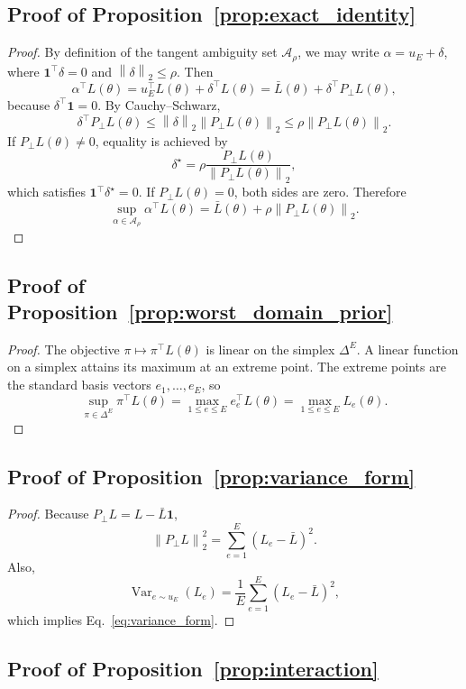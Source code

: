\documentclass{article}
\theoremstyle{definition}
\newcommand{\cA}{\mathcal{A}}
\newcommand{\Var}{\operatorname{Var}}
\newcommand{\one}{\mathbf{1}}
\newcommand{\simplex}{\Delta}
\newcommand{\norm}[1]{\left\lVert #1 \right\rVert}
\newcommand{\ub}{u_E}
\begin{document}
\subsection{Proof of Proposition~\ref{prop:exact_identity}}

\begin{proof}
By definition of the tangent ambiguity set \(\cA_\rho\), we may write \(\alpha=\ub+\delta\), where \(\one^\top\delta=0\) and \(\norm{\delta}_2\le \rho\). Then
\[
\alpha^\top L(\theta)
=
\ub^\top L(\theta) + \delta^\top L(\theta)
=
\bar L(\theta) + \delta^\top P_\perp L(\theta),
\]
because \(\delta^\top \one=0\). By Cauchy--Schwarz,
\[
\delta^\top P_\perp L(\theta)
\le
\norm{\delta}_2 \norm{P_\perp L(\theta)}_2
\le
\rho \norm{P_\perp L(\theta)}_2.
\]
If \(P_\perp L(\theta)\neq 0\), equality is achieved by
\[
\delta^\star
=
\rho \frac{P_\perp L(\theta)}{\norm{P_\perp L(\theta)}_2},
\]
which satisfies \(\one^\top\delta^\star=0\). If \(P_\perp L(\theta)=0\), both sides are zero. Therefore
\[
\sup_{\alpha\in\cA_\rho}\alpha^\top L(\theta)
=
\bar L(\theta) + \rho \norm{P_\perp L(\theta)}_2.
\]
\end{proof}

\subsection{Proof of Proposition~\ref{prop:worst_domain_prior}}

\begin{proof}
The objective \(\pi \mapsto \pi^\top L(\theta)\) is linear on the simplex \(\simplex^E\). A linear function on a simplex attains its maximum at an extreme point. The extreme points are the standard basis vectors \(e_1,\dots,e_E\), so
\[
\sup_{\pi\in\simplex^E} \pi^\top L(\theta)
=
\max_{1\le e\le E} e_e^\top L(\theta)
=
\max_{1\le e\le E}L_e(\theta).
\]
\end{proof}

\subsection{Proof of Proposition~\ref{prop:variance_form}}

\begin{proof}
Because \(P_\perp L=L-\bar L\one\),
\[
\norm{P_\perp L}_2^2
=
\sum_{e=1}^{E}(L_e-\bar L)^2.
\]
Also,
\[
\Var_{e\sim \ub}(L_e)
=
\frac{1}{E}\sum_{e=1}^{E}(L_e-\bar L)^2,
\]
which implies Eq.~\eqref{eq:variance_form}.
\end{proof}

\subsection{Proof of Proposition~\ref{prop:interaction}}
\end{document}
